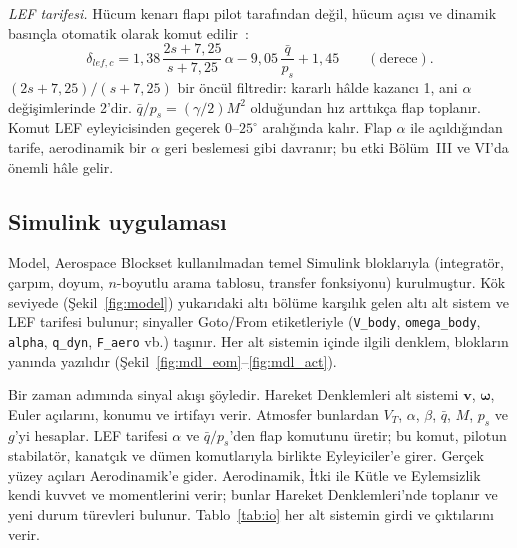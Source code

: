 \documentclass[conf]{new-aiaa}
\begin{document}
\emph{LEF tarifesi.} Hücum kenarı flapı pilot tarafından değil, hücum açısı ve dinamik basınçla otomatik olarak komut edilir~\cite{slj}:
\begin{equation}
\delta_{lef,c}=1,38\,\frac{2s+7,25}{s+7,25}\,\alpha-9,05\,\frac{\bar q}{p_s}+1,45\qquad(\text{derece}).
\label{eq:lef}
\end{equation}
$(2s+7,25)/(s+7,25)$ bir öncül filtredir: kararlı hâlde kazancı 1, ani $\alpha$ değişimlerinde 2'dir. $\bar q/p_s=(\gamma/2)M^2$ olduğundan hız arttıkça flap toplanır. Komut LEF eyleyicisinden geçerek $0$--$25^\circ$ aralığında kalır. Flap $\alpha$ ile açıldığından tarife, aerodinamik bir $\alpha$ geri beslemesi gibi davranır; bu etki Bölüm~III ve VI'da önemli hâle gelir.

\subsection{Simulink uygulaması}
Model, Aerospace Blockset kullanılmadan temel Simulink bloklarıyla (integratör, çarpım, doyum, $n$-boyutlu arama tablosu, transfer fonksiyonu) kurulmuştur. Kök seviyede (Şekil~\ref{fig:model}) yukarıdaki altı bölüme karşılık gelen altı alt sistem ve LEF tarifesi bulunur; sinyaller Goto/From etiketleriyle (\texttt{V\_body}, \texttt{omega\_body}, \texttt{alpha}, \texttt{q\_dyn}, \texttt{F\_aero} vb.) taşınır. Her alt sistemin içinde ilgili denklem, blokların yanında yazılıdır (Şekil~\ref{fig:mdl_eom}--\ref{fig:mdl_act}).

Bir zaman adımında sinyal akışı şöyledir. Hareket Denklemleri alt sistemi $\mathbf v$, $\boldsymbol\omega$, Euler açılarını, konumu ve irtifayı verir. Atmosfer bunlardan $V_T$, $\alpha$, $\beta$, $\bar q$, $M$, $p_s$ ve $g$'yi hesaplar. LEF tarifesi $\alpha$ ve $\bar q/p_s$'den flap komutunu üretir; bu komut, pilotun stabilatör, kanatçık ve dümen komutlarıyla birlikte Eyleyiciler'e girer. Gerçek yüzey açıları Aerodinamik'e gider. Aerodinamik, İtki ile Kütle ve Eylemsizlik kendi kuvvet ve momentlerini verir; bunlar Hareket Denklemleri'nde toplanır ve yeni durum türevleri bulunur. Tablo~\ref{tab:io} her alt sistemin girdi ve çıktılarını verir.
\end{document}
